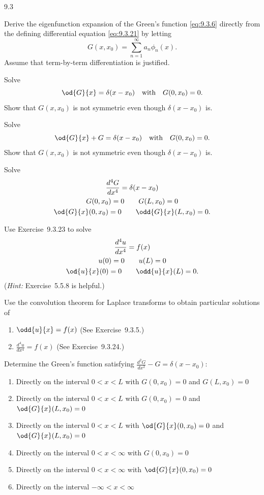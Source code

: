 \begin{exercises}{9.3}
\item Derive the eigenfunction expansion of the Green's function \eqref{eq:9.3.6} directly from the defining differential equation \eqref{eq:9.3.21} by letting
\[
G(x,x_0) = \sum_{n=1}^{\infty} a_n\phi_n(x).
\]
Assume that term-by-term differentiation is justified.

\item[\starred 9.3.21.] Solve
\[
\od{G}{x} = \delta(x - x_0) \quad\text{with}\quad G(0,x_0) = 0.
\]
Show that $G(x,x_0)$ is not symmetric even though $\delta(x-x_0)$ is.

\item Solve
\[
\od{G}{x} + G = \delta(x-x_0) \quad\text{with}\quad G(0,x_0) = 0.
\]
Show that $G(x,x_0)$ is not symmetric even though $\delta(x-x_0)$ is.

\item Solve
\begin{gather*}
\frac{d^4G}{dx^4} = \delta(x-x_0) \\
G(0,x_0) = 0 \qquad G(L,x_0) = 0 \\
\od{G}{x}(0,x_0) = 0 \qquad \odd{G}{x}(L,x_0) = 0.
\end{gather*}

\item Use Exercise~9.3.23 to solve
\begin{gather*}
\frac{d^4u}{dx^4} = f(x) \\
u(0) = 0 \qquad u(L) = 0 \\
\od{u}{x}(0) = 0 \qquad \odd{u}{x}(L) = 0.
\end{gather*}
(\textit{Hint:} Exercise~5.5.8 is helpful.)

\item Use the convolution theorem for Laplace transforms to obtain particular solutions of
\begin{enumerate}
\item[(a)] $\odd{u}{x} = f(x)$ (See Exercise~9.3.5.)
\item[\starred(b)] $\frac{d^4u}{dx^4} = f(x)$ (See Exercise~9.3.24.)
\end{enumerate}

\item Determine the Green's function satisfying $\frac{d^2G}{dx^2} - G = \delta(x-x_0)$:
\begin{enumerate}
\item[(a)] Directly on the interval $0 < x < L$ with $G(0,x_0) = 0$ and $G(L,x_0) = 0$
\item[(b)] Directly on the interval $0 < x < L$ with $G(0,x_0) = 0$ and $\od{G}{x}(L,x_0) = 0$
\item[(c)] Directly on the interval $0 < x < L$ with $\od{G}{x}(0,x_0) = 0$ and $\od{G}{x}(L,x_0) = 0$
\item[(d)] Directly on the interval $0 < x < \infty$ with $G(0,x_0) = 0$
\item[(e)] Directly on the interval $0 < x < \infty$ with $\od{G}{x}(0,x_0) = 0$
\item[(f)] Directly on the interval $-\infty < x < \infty$
\end{enumerate}

\end{exercises}
